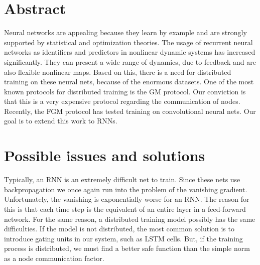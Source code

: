 \documentclass{article}
\begin{document}
    \section*{Abstract}
    Neural networks are appealing because they learn by example and are strongly supported by statistical and optimization theories.
    The usage of recurrent neural networks as identifiers and predictors in nonlinear dynamic systems has increased significantly.
    They can present a wide range of dynamics, due to feedback and are also flexible nonlinear maps.
    Based on this, there is a need for distributed training on these neural nets, because of the enormous datasets.
    One of the most known protocols for distributed training is the GM protocol.
    Our conviction is that this is a very expensive protocol regarding the communication of nodes.
    Recently, the FGM protocol has tested training on convolutional neural nets.
    Our goal is to extend this work to RNNs.

    \section*{Possible issues and solutions}
    Typically, an RNN is an extremely difficult net to train.
    Since these nets use backpropagation we once again run into the problem of the vanishing gradient.
    Unfortunately, the vanishing is exponentially worse for an RNN. The reason for this is that each time step is the equivalent of an entire layer in a feed-forward network.
    For the same reason, a distributed training model possibly has the same difficulties.
    If the model is not distributed, the most common solution is to introduce gating units in our system, such as LSTM cells.
    But, if the training process is distributed, we must find a better safe function than the simple norm as a node communication factor.

\end{document}
